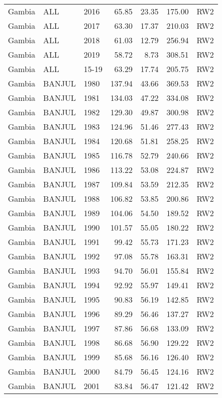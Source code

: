 \begin{longtable}{lllrrrl}
  Gambia & ALL & 2016 & 65.85 & 23.35 & 175.00 & RW2 \\ 
  Gambia & ALL & 2017 & 63.30 & 17.37 & 210.03 & RW2 \\ 
  Gambia & ALL & 2018 & 61.03 & 12.79 & 256.94 & RW2 \\ 
  Gambia & ALL & 2019 & 58.72 & 8.73 & 308.51 & RW2 \\ 
  Gambia & ALL & 15-19 & 63.29 & 17.74 & 205.75 & RW2 \\ 
  Gambia & BANJUL & 1980 & 137.94 & 43.66 & 369.53 & RW2 \\ 
  Gambia & BANJUL & 1981 & 134.03 & 47.22 & 334.08 & RW2 \\ 
  Gambia & BANJUL & 1982 & 129.30 & 49.87 & 300.98 & RW2 \\ 
  Gambia & BANJUL & 1983 & 124.96 & 51.46 & 277.43 & RW2 \\ 
  Gambia & BANJUL & 1984 & 120.68 & 51.81 & 258.25 & RW2 \\ 
  Gambia & BANJUL & 1985 & 116.78 & 52.79 & 240.66 & RW2 \\ 
  Gambia & BANJUL & 1986 & 113.22 & 53.08 & 224.87 & RW2 \\ 
  Gambia & BANJUL & 1987 & 109.84 & 53.59 & 212.35 & RW2 \\ 
  Gambia & BANJUL & 1988 & 106.82 & 53.85 & 200.86 & RW2 \\ 
  Gambia & BANJUL & 1989 & 104.06 & 54.50 & 189.52 & RW2 \\ 
  Gambia & BANJUL & 1990 & 101.57 & 55.05 & 180.22 & RW2 \\ 
  Gambia & BANJUL & 1991 & 99.42 & 55.73 & 171.23 & RW2 \\ 
  Gambia & BANJUL & 1992 & 97.08 & 55.78 & 163.31 & RW2 \\ 
  Gambia & BANJUL & 1993 & 94.70 & 56.01 & 155.84 & RW2 \\ 
  Gambia & BANJUL & 1994 & 92.92 & 55.97 & 149.41 & RW2 \\ 
  Gambia & BANJUL & 1995 & 90.83 & 56.19 & 142.85 & RW2 \\ 
  Gambia & BANJUL & 1996 & 89.29 & 56.46 & 137.27 & RW2 \\ 
  Gambia & BANJUL & 1997 & 87.86 & 56.68 & 133.09 & RW2 \\ 
  Gambia & BANJUL & 1998 & 86.68 & 56.90 & 129.22 & RW2 \\ 
  Gambia & BANJUL & 1999 & 85.68 & 56.16 & 126.40 & RW2 \\ 
  Gambia & BANJUL & 2000 & 84.79 & 56.45 & 124.16 & RW2 \\ 
  Gambia & BANJUL & 2001 & 83.84 & 56.47 & 121.42 & RW2 \\ 

\end{longtable}
